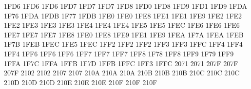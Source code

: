 \setcclcucx 1FD6 1FD6 1FD6 %
\setcclcucx 1FD7 1FD7 1FD7 %
\setcclcucx 1FD8 1FD0 1FD8 %
\setcclcucx 1FD9 1FD1 1FD9 %
\setcclcucx 1FDA 1F76 1FDA %
\setcclcucx 1FDB 1F77 1FDB %
\setcclcucx 1FE0 1FE0 1FE8 %
\setcclcucx 1FE1 1FE1 1FE9 %
\setcclcucx 1FE2 1FE2 1FE2 %
\setcclcucx 1FE3 1FE3 1FE3 %
\setcclcucx 1FE4 1FE4 1FE4 %
\setcclcucx 1FE5 1FE5 1FEC %
\setcclcucx 1FE6 1FE6 1FE6 %
\setcclcucx 1FE7 1FE7 1FE7 %
\setcclcucx 1FE8 1FE0 1FE8 %
\setcclcucx 1FE9 1FE1 1FE9 %
\setcclcucx 1FEA 1F7A 1FEA %
\setcclcucx 1FEB 1F7B 1FEB %
\setcclcucx 1FEC 1FE5 1FEC %
\setcclcucx 1FF2 1FF2 1FF2 %
\setcclcucx 1FF3 1FF3 1FFC %
\setcclcucx 1FF4 1FF4 1FF4 %
\setcclcucx 1FF6 1FF6 1FF6 %
\setcclcucx 1FF7 1FF7 1FF7 %
\setcclcucx 1FF8 1F78 1FF8 %
\setcclcucx 1FF9 1F79 1FF9 %
\setcclcucx 1FFA 1F7C 1FFA %
\setcclcucx 1FFB 1F7D 1FFB %
\setcclcucx 1FFC 1FF3 1FFC %
 2071 2071 %
\setcclcucx 207F 207F 207F %
 2102 2102 %
 2107 2107 %
\setcclcucx 210A 210A 210A %
\setcclcucx 210B 210B 210B %
\setcclcucx 210C 210C 210C %
\setcclcucx 210D 210D 210D %
\setcclcucx 210E 210E 210E %
\setcclcucx 210F 210F 210F %
